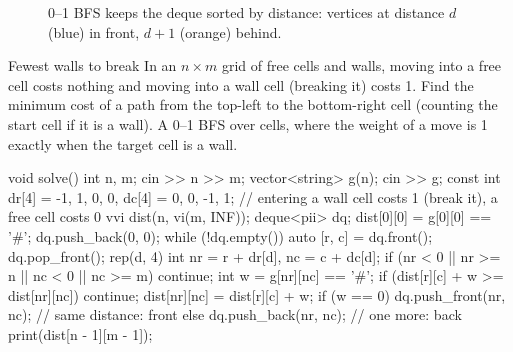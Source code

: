 \begin{figure}[htbp]
\centering
{}
\caption{0--1 BFS keeps the deque sorted by distance: vertices at distance $d$ (blue) in front, $d + 1$ (orange) behind.}
\label{fig:01bfs}
\end{figure}

\begin{problem}{Fewest walls to break}
In an $n \times m$ grid of free cells and walls, moving into a free cell costs nothing and moving into a wall cell (breaking it)
costs 1. Find the minimum cost of a path from the top-left to the bottom-right cell (counting the start cell if it is a wall).
\solution A 0--1 BFS over cells, where the weight of a move is 1 exactly when the target cell is a wall.
\end{problem}

\begin{code}
void solve() {
    int n, m;
    cin >> n >> m;
    vector<string> g(n);
    cin >> g;
    const int dr[4] = {-1, 1, 0, 0}, dc[4] = {0, 0, -1, 1};
    // entering a wall cell costs 1 (break it), a free cell costs 0
    vvi dist(n, vi(m, INF));
    deque<pii> dq;
    dist[0][0] = g[0][0] == '#';
    dq.push_back({0, 0});
    while (!dq.empty()) {
        auto [r, c] = dq.front();
        dq.pop_front();
        rep(d, 4) {
            int nr = r + dr[d], nc = c + dc[d];
            if (nr < 0 || nr >= n || nc < 0 || nc >= m) continue;
            int w = g[nr][nc] == '#';
            if (dist[r][c] + w >= dist[nr][nc]) continue;
            dist[nr][nc] = dist[r][c] + w;
            if (w == 0) dq.push_front({nr, nc});  // same distance: front
            else dq.push_back({nr, nc});  // one more: back
        }
    }
    print(dist[n - 1][m - 1]);
}
\end{code}

